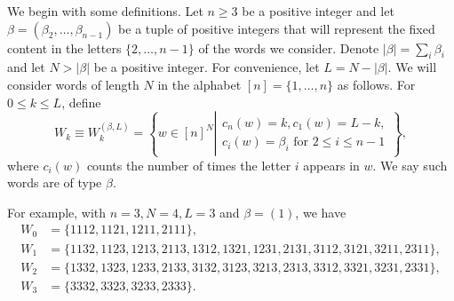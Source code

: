 \documentclass[ALCO,Unicode]{cedram}
\begin{document}
We begin with some definitions. Let $n \geq 3$ be a positive integer and let $\beta = (\beta_2,\dots, \beta_{n-1})$ be a tuple of positive integers that will represent the fixed content in the letters $\{2,\ldots,n-1\}$ of the words we consider. 
Denote $|\beta| = \sum_i \beta_i$ and let $N > |\beta|$ be a positive integer. For convenience, let $L = N - |\beta|$.
We will consider words of length $N$ in the alphabet $[n] = \{1,\dots, n\}$ as follows. For $0 \leq k \leq L$, define
\begin{equation}
\label{wk-def}
W_k \equiv W^{(\beta,L)}_k = \left\{ w \in [n]^N 
\left| 
\begin{matrix}
c_n(w) = k, c_1(w) = L-k,  \\
c_i(w) = \beta_i \text{ for } 2 \leq i \leq n-1
\end{matrix}  
\right. \right\},
\end{equation}
where $c_i(w)$ counts the number of times the letter $i$ appears in $w$. We say such words are of type $\beta$.

\begin{example}
\label{eg:Wk}
For example, with $n=3, N = 4, L = 3$ and $\beta = (1)$, we have
\begin{equation}
\label{Wk-eg}
\begin{split}
W_0 &= \{1112, 1121, 1211, 2111\}, \\
W_1 &= \{1132, 1123, 1213, 2113,1312, 1321, 1231, 2131,3112, 3121, 3211, 2311\}, \\
W_2 &= \{1332, 1323, 1233, 2133,3132, 3123, 3213, 2313,3312, 3321, 3231, 2331\},\\
W_3 &= \{3332, 3323, 3233, 2333\}.
\end{split}
\end{equation}
\end{example}
\end{document}
